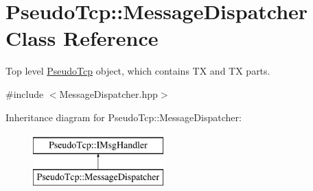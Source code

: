 \hypertarget{classPseudoTcp_1_1MessageDispatcher}{
\section{PseudoTcp::MessageDispatcher Class Reference}
\label{classPseudoTcp_1_1MessageDispatcher}
}


Top level \hyperlink{namespacePseudoTcp}{PseudoTcp} object, which contains TX and TX parts.  




{\ttfamily \#include $<$MessageDispatcher.hpp$>$}

Inheritance diagram for PseudoTcp::MessageDispatcher:\begin{figure}[H]
\begin{center}
\leavevmode
\includegraphics[height=2cm]{classPseudoTcp_1_1MessageDispatcher}
\end{center}
\end{figure}
